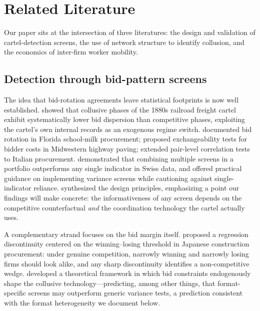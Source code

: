 \section{Related Literature}\label{literature}

Our paper sits at the intersection of three literatures: the design and validation of cartel-detection screens, the use of network structure to identify collusion, and the economics of inter-firm worker mobility.

\subsection{Detection through bid-pattern screens}

The idea that bid-rotation agreements leave statistical footprints is now well established. \citet{porter1993detecting} showed that collusive phases of the 1880s railroad freight cartel exhibit systematically lower bid dispersion than competitive phases, exploiting the cartel's own internal records as an exogenous regime switch. \citet{pesendorfer2000study} documented bid rotation in Florida school-milk procurement; \citet{bajari2003detecting} proposed exchangeability tests for bidder costs in Midwestern highway paving; \citet{conley2016detecting} extended pair-level correlation tests to Italian procurement. \citet{imhof2018screening} demonstrated that combining multiple screens in a portfolio outperforms any single indicator in Swiss data, and \citet{abrantesmetz2006variance} offered practical guidance on implementing variance screens while cautioning against single-indicator reliance. \citet{harrington2008detecting} synthesized the design principles, emphasizing a point our findings will make concrete: the informativeness of any screen depends on the competitive counterfactual \emph{and} the coordination technology the cartel actually uses.

A complementary strand focuses on the bid margin itself. \citet{kawai2023using} proposed a regression discontinuity centered on the winning--losing threshold in Japanese construction procurement: under genuine competition, narrowly winning and narrowly losing firms should look alike, and any sharp discontinuity identifies a non-competitive wedge. \citet{chassang2019collusion} developed a theoretical framework in which bid constraints endogenously shape the collusive technology---predicting, among other things, that format-specific screens may outperform generic variance tests, a prediction consistent with the format heterogeneity we document below.

